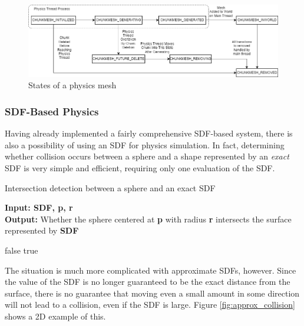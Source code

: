 \documentclass{article}
\begin{document}
 \begin{figure}[H]
  \includegraphics[width=\textwidth]{physics_states.png}
  \caption{States of a physics mesh}
  \label{fig:physics_states}
\end{figure}

\subsubsection{SDF-Based Physics}
Having already implemented a fairly comprehensive SDF-based system, there is also a possibility of using an SDF for physics simulation. In fact, determining whether collision occurs between a sphere and a shape represented by an \textit{exact} SDF is very simple and efficient, requiring only one evaluation of the SDF.

\begin{algorithm}[H]
  \caption{Intersection detection between a sphere and an exact SDF}\label{alg:sdf_sphere_collision}
  \hspace*{\algorithmicindent} \textbf{Input: SDF, p, r} \\
  \hspace*{\algorithmicindent} \textbf{Output:} Whether the sphere centered at \textbf{p} with radius \textbf{r} intersects the surface represented by \textbf{SDF} 
  \begin{algorithmic}
   \State\Return false
  \Else \State \Return true
  \EndIf
  \end{algorithmic}
\end{algorithm}

The situation is much more complicated with approximate SDFs, however. Since the value of the SDF is no longer guaranteed to be the exact distance from the surface, there is no guarantee that moving even a small amount in some direction will not lead to a collision, even if the SDF is large. Figure \ref{fig:approx_collision} shows a 2D example of this.
\end{document}
